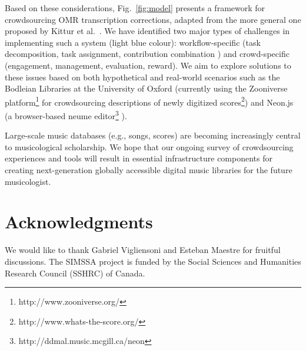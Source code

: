 \documentclass{sig-alternate}
\begin{document}
Based on these considerations, Fig.~\ref{fig:model} presents a framework for crowdsourcing OMR transcription corrections, adapted from the more general one proposed by Kittur et al.~\cite[Fig.~2]{kittur2013}. We have identified two major types of challenges in implementing such a system (light blue colour): workflow-specific (task decomposition, task assignment, contribution combination \cite{doan2011}) and crowd-specific (engagement, management, evaluation, reward). We aim to explore solutions to these issues based on both hypothetical and real-world scenarios such as the Bodleian Libraries at the University of Oxford (currently using the Zooniverse platform\footnote{http://www.zooniverse.org/} for crowdsourcing descriptions of newly digitized scores\footnote{http://www.whats-the-score.org/}) and Neon.js (a browser-based neume editor\footnote{http://ddmal.music.mcgill.ca/neon} \cite{burlet2012}). 

Large-scale music databases (e.g., songs, scores) are becoming increasingly central to musicological scholarship. We hope that our ongoing survey of crowdsourcing experiences and tools will result in essential infrastructure components for creating next-generation globally accessible digital music libraries for the future musicologist.


\section{Acknowledgments}

We would like to thank Gabriel Vigliensoni and Esteban Maestre for fruitful discussions. The SIMSSA project is funded by the Social Sciences and Humanities Research Council (SSHRC) of Canada. 


 
\end{document}

